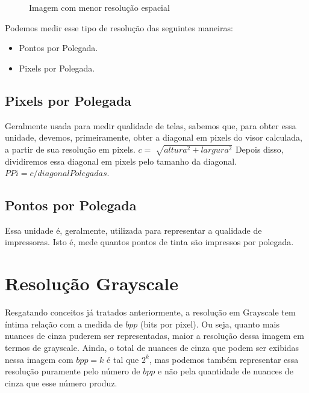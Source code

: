 \documentclass[a4paper, 12pt]{article}
\begin{document}
\begin{figure}[!htb]
	  \caption{Imagem com menor resolução espacial}
	\endminipage
\end{figure}
Podemos medir esse tipo de resolução das seguintes maneiras:
\begin{itemize}
	\item Pontos por Polegada.
 	\item Pixels por Polegada.
\end{itemize}

\subsection{Pixels por Polegada}
Geralmente usada para medir qualidade de telas, sabemos que, para obter essa unidade, devemos, primeiramente, 
obter a diagonal em pixels do visor calculada, a partir de sua resolução em pixels. $c = \sqrt[]{altura^2 + largura^2}$
Depois disso, dividiremos essa diagonal em pixels pelo tamanho da diagonal. $PPi = c/diagonalPolegadas$.

\subsection{Pontos por Polegada}
Essa unidade é, geralmente, utilizada para representar a qualidade de impressoras. Isto é, mede quantos pontos de tinta são impressos 
por polegada.

\section{Resolução Grayscale}
Resgatando conceitos já tratados anteriormente, a resolução em Grayscale tem íntima relação com a medida de $bpp$ (bits por pixel). Ou seja, 
quanto mais nuances de cinza puderem ser representadas, maior a resolução dessa imagem em termos de grayscale. Ainda, o total de nuances de cinza 
que podem ser exibidas nessa imagem com $bpp = k$ é tal que $2^k$, mas podemos também representar essa resolução puramente pelo número de 
$bpp$ e não pela quantidade de nuances de cinza que esse número produz.
\end{document}
